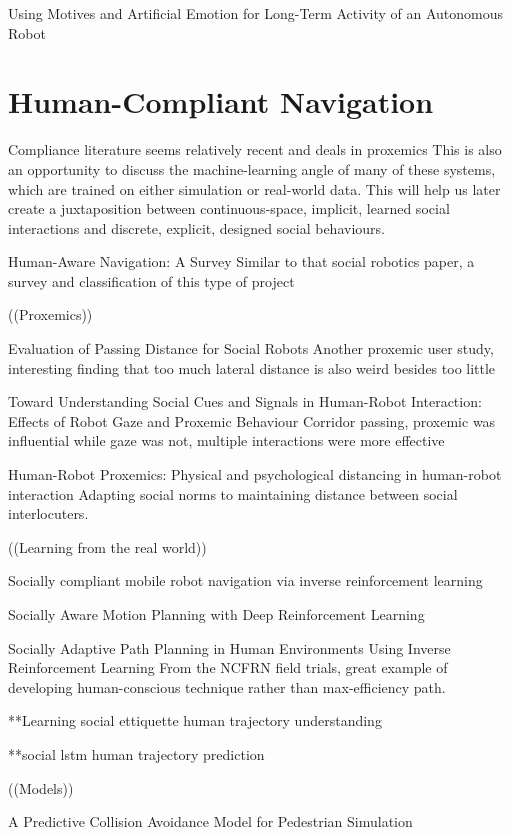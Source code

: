 \documentclass{sfuthesis}
\begin{document}
Using Motives and Artificial Emotion for Long-Term Activity of an Autonomous Robot


\section{Human-Compliant Navigation}

Compliance literature seems relatively recent and deals in proxemics This is also an opportunity to discuss the machine-learning angle of many of these systems, which are trained on either simulation or real-world data. This will help us later create a juxtaposition between continuous-space, implicit, learned social interactions and discrete, explicit, designed social behaviours.


Human-Aware Navigation: A Survey	Similar to that social robotics paper, a survey and classification of this type of project



((Proxemics))

Evaluation of Passing Distance for Social Robots	Another proxemic user study, interesting finding that too much lateral distance is also weird besides too little	

Toward Understanding Social Cues and Signals in Human-Robot Interaction: Effects of Robot Gaze and Proxemic Behaviour	Corridor passing, proxemic was influential while gaze was not, multiple interactions were more effective	

Human-Robot Proxemics: Physical and psychological distancing in human-robot interaction	Adapting social norms to maintaining distance between social interlocuters.


((Learning from the real world))

Socially compliant mobile robot navigation via inverse reinforcement learning

Socially Aware Motion Planning with Deep Reinforcement Learning

Socially Adaptive Path Planning in Human Environments Using Inverse Reinforcement Learning	From the NCFRN field trials, great example of developing human-conscious technique rather than max-efficiency path.	

**Learning social ettiquette human trajectory understanding

**social lstm human trajectory prediction

((Models))

A Predictive Collision Avoidance Model for Pedestrian Simulation
\end{document}
